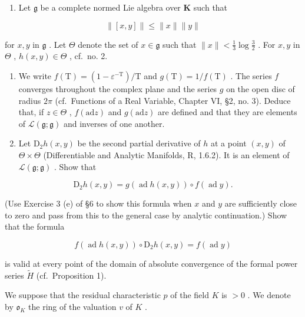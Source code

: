 
\begin{enumerate}
\def\labelenumi{\arabic{enumi}.}
\tightlist
\item
  Let \(\mathfrak{g}\) be a complete normed Lie algebra over \(\mathbf{K}\) such that
\end{enumerate}

\[
\| [ x, y ] \| \leqslant \| x \| \| y \|
\]

for \(x, y\) in \(\mathfrak{g}\) . Let \(\Theta\) denote the set of \(x \in \mathfrak{g}\) such that \(\| x \| < \frac{1}{3} \log \frac{3}{2}\) . For \(x, y\) in \(\Theta\) , \(h(x, y) \in \Theta\) , cf.~no. 2.

\begin{enumerate}
\def\labelenumi{(\alph{enumi})}
\item
  We write \(f(\mathrm{T}) = (1 - \varepsilon^{-\mathrm{T}}) / \mathrm{T}\) and \(g(\mathrm{T}) = 1 / f(\mathrm{T})\) . The series \(f\) converges throughout the complex plane and the series \(g\) on the open disc of radius \(2\pi\) (cf.~Functions of a Real Variable, Chapter VI, §2, no. 3). Deduce that, if \(z \in \Theta\) , \(f(\mathrm{ad}z)\) and \(g(\mathrm{ad}z)\) are defined and that they are elements of \(\mathcal{L}(\mathfrak{g};\mathfrak{g})\) and inverses of one another.
\item
  Let \(\mathrm{D}_2h(x,y)\) be the second partial derivative of \(h\) at a point \((x,y)\) of \(\Theta \times \Theta\) (Differentiable and Analytic Manifolds, R, 1.6.2). It is an element of \(\mathcal{L}(\mathfrak{g};\mathfrak{g})\) . Show that
\end{enumerate}

\[
\mathrm{D} _ {2} h (x, y) = g (\operatorname{ad} h (x, y)) \circ f (\operatorname{ad} y).
\]

(Use Exercise 3 (e) of §6 to show this formula when \(x\) and \(y\) are sufficiently close to zero and pass from this to the general case by analytic continuation.) Show that the formula

\[
f (\operatorname{ad} h (x, y)) \circ \mathrm{D} _ {2} h (x, y) = f (\operatorname{ad} y)
\]

is valid at every point of the domain of absolute convergence of the formal power series \(\tilde{H}\) (cf.~Proposition 1).


We suppose that the residual characteristic \(p\) of the field \(K\) is \(>0\) . We denote by \(\mathfrak{o}_{K}\) the ring of the valuation \(v\) of \(K\) .

